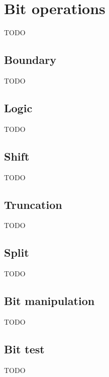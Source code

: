 \chapter{Bit operations}
\label{chap:Bit operations}

TODO

\vspace{1cm}
\minitoc


\newpage
\section{Boundary}
\label{sec:Boundary}

TODO %


\newpage
\section{Logic}
\label{sec:Logic}

TODO %


\newpage
\section{Shift}
\label{sec:Shift}

TODO %


\newpage
\section{Truncation}
\label{sec:Truncation}

TODO %


\newpage
\section{Split}
\label{sec:Split}

TODO %


\newpage
\section{Bit manipulation}
\label{sec:Bit manipulation}

TODO %


\newpage
\section{Bit test}
\label{sec:Bit test}

TODO %
